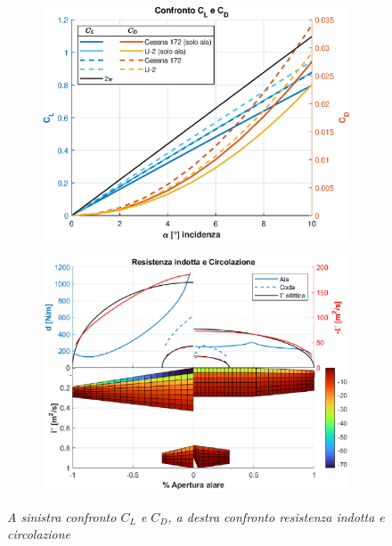 \documentclass{jfm}
\begin{document}
\begin{figure}
\centering
    \begin{subfigure}{0.5\textwidth}
    \centering
        \includegraphics[width=\linewidth]{./figures/Ali_code_CL_CD.eps}
        
    \end{subfigure}%
    \begin{subfigure}{0.5\textwidth}
    \centering
        \includegraphics[width=\linewidth]{./figures/Distribuzioni_Ali_Code.eps}
    \end{subfigure}
    \caption{\textit{A sinistra confronto $C_L$ e $C_D$, a destra confronto resistenza indotta e circolazione}}
    
        \label{fig:coefficienti}
\end{figure}
\end{document}
